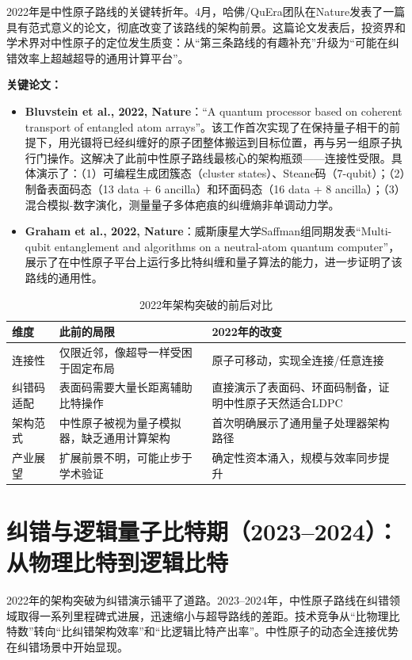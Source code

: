 \documentclass[11pt,a4paper]{ctexart}
\begin{document}
2022年是中性原子路线的关键转折年。4月，哈佛/QuEra团队在Nature发表了一篇具有范式意义的论文，彻底改变了该路线的架构前景。这篇论文发表后，投资界和学术界对中性原子的定位发生质变：从``第三条路线的有趣补充''升级为``可能在纠错效率上超越超导的通用计算平台''。

\textbf{关键论文：}
\begin{itemize}
\item \textbf{Bluvstein et al., 2022, Nature}：``A quantum processor based on coherent transport of entangled atom arrays''。该工作首次实现了在保持量子相干的前提下，用光镊将已经纠缠好的原子团整体搬运到目标位置，再与另一组原子执行门操作。这解决了此前中性原子路线最核心的架构瓶颈——连接性受限。具体演示了：（1）可编程生成团簇态（cluster states）、Steane码（7-qubit）；（2）制备表面码态（13 data + 6 ancilla）和环面码态（16 data + 8 ancilla）；（3）混合模拟-数字演化，测量量子多体疤痕的纠缠熵非单调动力学。
\item \textbf{Graham et al., 2022, Nature}：威斯康星大学Saffman组同期发表``Multi-qubit entanglement and algorithms on a neutral-atom quantum computer''，展示了在中性原子平台上运行多比特纠缠和量子算法的能力，进一步证明了该路线的通用性。
\end{itemize}

\begin{table}[h]
\centering
\caption{2022年架构突破的前后对比}
\begin{tabular}{p{2.5cm}p{5cm}p{5cm}}
\toprule
\textbf{维度} & \textbf{此前的局限} & \textbf{2022年的改变} \\
\midrule
连接性 & 仅限近邻，像超导一样受困于固定布局 & 原子可移动，实现全连接/任意连接 \\
\midrule
纠错码适配 & 表面码需要大量长距离辅助比特操作 & 直接演示了表面码、环面码制备，证明中性原子天然适合LDPC \\
\midrule
架构范式 & 中性原子被视为量子模拟器，缺乏通用计算架构 & 首次明确展示了通用量子处理器架构路径 \\
\midrule
产业展望 & 扩展前景不明，可能止步于学术验证 & 确定性资本涌入，规模与效率同步提升 \\
\bottomrule
\end{tabular}
\end{table}

\section{纠错与逻辑量子比特期（2023--2024）：从物理比特到逻辑比特}

2022年的架构突破为纠错演示铺平了道路。2023--2024年，中性原子路线在纠错领域取得一系列里程碑式进展，迅速缩小与超导路线的差距。技术竞争从``比物理比特数''转向``比纠错架构效率''和``比逻辑比特产出率''。中性原子的动态全连接优势在纠错场景中开始显现。
\end{document}
